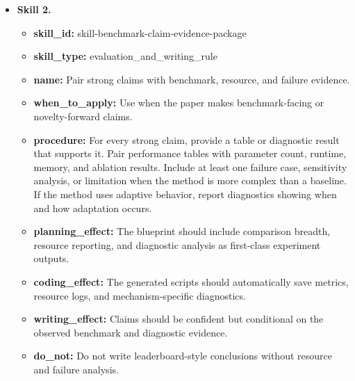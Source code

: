 \documentclass{opendatalab}
\begin{document}
\begin{tcolorbox}
\begin{itemize}
  \item \textbf{Skill 2.}
  \begin{itemize}\setlength\itemsep{1pt}
    \item \textbf{skill\_id:} skill-benchmark-claim-evidence-package
    \item \textbf{skill\_type:} evaluation\_and\_writing\_rule
    \item \textbf{name:} Pair strong claims with benchmark, resource, and failure evidence.
    \item \textbf{when\_to\_apply:} Use when the paper makes benchmark-facing or novelty-forward claims.
    \item \textbf{procedure:} For every strong claim, provide a table or diagnostic result that supports it. Pair performance tables with parameter count, runtime, memory, and ablation results. Include at least one failure case, sensitivity analysis, or limitation when the method is more complex than a baseline. If the method uses adaptive behavior, report diagnostics showing when and how adaptation occurs.
    \item \textbf{planning\_effect:} The blueprint should include comparison breadth, resource reporting, and diagnostic analysis as first-class experiment outputs.
    \item \textbf{coding\_effect:} The generated scripts should automatically save metrics, resource logs, and mechanism-specific diagnostics.
    \item \textbf{writing\_effect:} Claims should be confident but conditional on the observed benchmark and diagnostic evidence.
    \item \textbf{do\_not:} Do not write leaderboard-style conclusions without resource and failure analysis.
  \end{itemize}
\end{itemize}
\end{tcolorbox}

\end{document}
